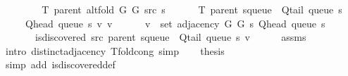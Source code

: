 \begin{isabellebody}
\isatagproof
{}\isamarkupfalse%
\ {\isacharminus}{\kern0pt}\isanewline
\ \ \isamarkupfalse%
\isanewline
\ \ \ \ {\isachardoublequoteopen}T\ {\isacharparenleft}{\kern0pt}parent\ {\isacharparenleft}{\kern0pt}alt{\isacharunderscore}{\kern0pt}fold\ G{}\ G{}\ src\ s{\isacharparenright}{\kern0pt}{\isacharparenright}{\kern0pt}\ {\isacharequal}{\kern0pt}\isanewline
\ \ \ \ \ T\ {\isacharparenleft}{\kern0pt}parent\ {\isacharparenleft}{\kern0pt}s{\isasymlparr}queue\ {\isacharcolon}{\kern0pt}{\isacharequal}{\kern0pt}\ Q{\isacharunderscore}{\kern0pt}tail\ {\isacharparenleft}{\kern0pt}queue\ s{\isacharparenright}{\kern0pt}{\isasymrparr}{\isacharparenright}{\kern0pt}{\isacharparenright}{\kern0pt}\ {\isasymunion}\isanewline
\ \ \ \ \ {\isacharbraceleft}{\kern0pt}{\isacharparenleft}{\kern0pt}Q{\isacharunderscore}{\kern0pt}head\ {\isacharparenleft}{\kern0pt}queue\ s{\isacharparenright}{\kern0pt}{\isacharcomma}{\kern0pt}\ v{\isacharparenright}{\kern0pt}\ {\isacharbar}{\kern0pt}v{\isachardot}{\kern0pt}\isanewline
\ \ \ \ \ \ v\ {\isasymin}\ set\ {\isacharparenleft}{\kern0pt}adjacency\ G{}\ G{}\ s\ {\isacharparenleft}{\kern0pt}Q{\isacharunderscore}{\kern0pt}head\ {\isacharparenleft}{\kern0pt}queue\ s{\isacharparenright}{\kern0pt}{\isacharparenright}{\kern0pt}{\isacharparenright}{\kern0pt}\ {\isasymand}\isanewline
\ \ \ \ \ \ {\isasymnot}\ is{\isacharunderscore}{\kern0pt}discovered\ src\ {\isacharparenleft}{\kern0pt}parent\ {\isacharparenleft}{\kern0pt}s{\isasymlparr}queue\ {\isacharcolon}{\kern0pt}{\isacharequal}{\kern0pt}\ Q{\isacharunderscore}{\kern0pt}tail\ {\isacharparenleft}{\kern0pt}queue\ s{\isacharparenright}{\kern0pt}{\isasymrparr}{\isacharparenright}{\kern0pt}{\isacharparenright}{\kern0pt}\ v{\isacharbraceright}{\kern0pt}{\isachardoublequoteclose}\isanewline
\ \ \ \ \isamarkupfalse%
\ assms\isanewline
\ \ \ \ \isamarkupfalse%
\ {\isacharparenleft}{\kern0pt}intro\ distinct{\isacharunderscore}{\kern0pt}adjacency\ T{\isacharunderscore}{\kern0pt}fold{\isacharunderscore}{\kern0pt}cong{\isacharparenright}{\kern0pt}\ simp\isanewline
\ \ \isamarkupfalse%
\ {\isacharquery}{\kern0pt}thesis\isanewline
\ \ \ \ \isamarkupfalse%
\ {\isacharparenleft}{\kern0pt}simp\ add{\isacharcolon}{\kern0pt}\ is{\isacharunderscore}{\kern0pt}discovered{\isacharunderscore}{\kern0pt}def{\isacharparenright}{\kern0pt}\isanewline
{}\isamarkupfalse%
%
\endisatagproof
{\isafoldproof}%
%
\isadelimproof
\isanewline
%
\endisadelimproof
\isanewline

\end{isabellebody}
